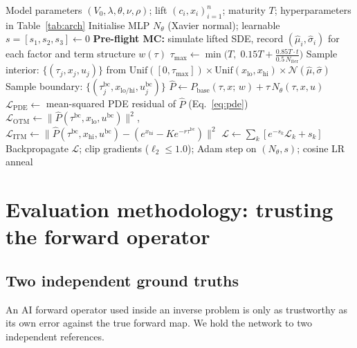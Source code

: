 \documentclass[preprint,12pt]{elsarticle}
\begin{document}
\begin{algorithm}[t]
\caption{Training the PINN forward operator for the lifted rough-Heston PDE}
\label{alg:train}
\begin{algorithmic}[1]
\Require Model parameters $(V_0,\lambda,\theta,\nu,\rho)$; lift $(c_i,x_i)_{i=1}^n$;
         maturity $T$; hyperparameters in Table~\ref{tab:arch}
\State Initialise MLP $N_\theta$ (Xavier normal); learnable $s = [s_1,s_2,s_3] \leftarrow 0$
\State \textbf{Pre-flight MC:} simulate lifted SDE, record $(\hat\mu_i, \hat\sigma_i)$
       for each factor and term structure $w(\tau)$ 
  \State $\tau_{\mathrm{max}} \leftarrow \min\!\bigl(T,\; 0.15T + \tfrac{0.85T \cdot t}{0.5\,N_{\mathrm{iter}}}\bigr)$
  \State Sample interior: $\{(\tau_j, x_j, u_j)\}$ from
         $\mathrm{Unif}([0,\tau_{\mathrm{max}}])\times\mathrm{Unif}(x_{\mathrm{lo}},x_{\mathrm{hi}})
         \times\mathcal{N}(\hat\mu,\hat\sigma)$
  \State Sample boundary: $\{(\tau^{\mathrm{bc}}_j, x_{\mathrm{lo/hi}}, u^{\mathrm{bc}}_j)\}$
  \State $\hat P \leftarrow P_{\mathrm{base}}(\tau,x;\,w) + \tau\,N_\theta(\tau,x,u)$
  \State $\mathcal{L}_{\mathrm{PDE}} \leftarrow$ mean-squared PDE residual of $\hat P$
         (Eq.~\eqref{eq:pde})
  \State $\mathcal{L}_{\mathrm{OTM}} \leftarrow \|\hat P(\tau^{\mathrm{bc}},x_{\mathrm{lo}},u^{\mathrm{bc}})\|^2$,\quad
         $\mathcal{L}_{\mathrm{ITM}} \leftarrow \|\hat P(\tau^{\mathrm{bc}},x_{\mathrm{hi}},u^{\mathrm{bc}}) - (e^{x_{\mathrm{hi}}} - Ke^{-r\tau^{\mathrm{bc}}})\|^2$
  \State $\mathcal{L} \leftarrow \sum_k [e^{-s_k}\mathcal{L}_k + s_k]$
  \State Backpropagate $\mathcal{L}$; clip gradients ($\ell_2 \leq 1.0$); Adam step
         on $(N_\theta, s)$; cosine LR anneal
\EndFor
\end{algorithmic}
\end{algorithm}

\section{Evaluation methodology: trusting the forward operator}
\label{sec:eval}

\subsection{Two independent ground truths}
An AI forward operator used inside an inverse problem is only as trustworthy as
its own error against the true forward map. We hold the network to two
independent references.
\end{document}
